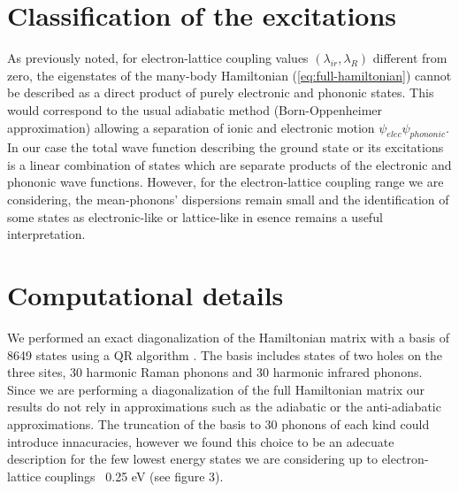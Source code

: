 \section{Classification of the excitations}
\label{sec:classification}


As previously noted, for electron-lattice coupling values $(\lambda_{ir},\lambda_R)$ different from zero, the eigenstates of the many-body Hamiltonian (\ref{eq:full-hamiltonian}) cannot be described as a direct product of purely electronic and phononic states. 
This would correspond to the usual adiabatic method (Born-Oppenheimer approximation) allowing a separation of ionic and electronic motion $\psi_{elec}\psi_{phononic}$. 
In our case the total wave function describing the ground state or its excitations is a linear combination of states which are separate products of the electronic and phononic wave functions. 
However, for the electron-lattice coupling range we are considering, the mean-phonons' dispersions remain small and the identification of some states as electronic-like or lattice-like in esence remains a useful interpretation.


\section{Computational details}
\label{sec:comp_details}


We performed an exact diagonalization of the Hamiltonian matrix with a basis of 8649 states using a QR algorithm \cite{eigenweb}. 
The basis includes states of two holes on the three sites, 30 harmonic Raman phonons and 30 harmonic infrared phonons. 
Since we are performing a diagonalization of the full Hamiltonian matrix our results do not rely in approximations such as the adiabatic or the anti-adiabatic approximations. 
The  truncation of the basis to 30 phonons of each kind could introduce innacuracies, however we found this choice to be an adecuate description for the few lowest energy states we are considering up to electron-lattice couplings ~0.25 eV (see figure 3).
